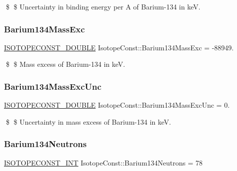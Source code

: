\$ \$ Uncertainty in binding energy per A of Barium-\/134 in keV. \mbox{\label{group___isotope_const-_barium-_ba134_ga58df3934c6c878f1479992f25af3373b}} 
\subsubsection{\texorpdfstring{Barium134\+Mass\+Exc}{Barium134MassExc}}
{\footnotesize\ttfamily \mbox{\hyperlink{group___isotope_const-_macros_ga8f45a7272ce02c0b4c65c44636ed719a}{I\+S\+O\+T\+O\+P\+E\+C\+O\+N\+S\+T\+\_\+\+D\+O\+U\+B\+LE}} Isotope\+Const\+::\+Barium134\+Mass\+Exc = -\/88949.}

\$ \$ Mass excess of Barium-\/134 in keV. \mbox{\label{group___isotope_const-_barium-_ba134_ga915fd84c73e27a6b4ebd34715c513633}} 
\subsubsection{\texorpdfstring{Barium134\+Mass\+Exc\+Unc}{Barium134MassExcUnc}}
{\footnotesize\ttfamily \mbox{\hyperlink{group___isotope_const-_macros_ga8f45a7272ce02c0b4c65c44636ed719a}{I\+S\+O\+T\+O\+P\+E\+C\+O\+N\+S\+T\+\_\+\+D\+O\+U\+B\+LE}} Isotope\+Const\+::\+Barium134\+Mass\+Exc\+Unc = 0.}

\$ \$ Uncertainty in mass excess of Barium-\/134 in keV. \mbox{\label{group___isotope_const-_barium-_ba134_gac3d1ecad94daee22a16ba9f3e88948f1}} 
\subsubsection{\texorpdfstring{Barium134\+Neutrons}{Barium134Neutrons}}
{\footnotesize\ttfamily \mbox{\hyperlink{group___isotope_const-_macros_ga5f18360b3e99483a35c32d789e62621c}{I\+S\+O\+T\+O\+P\+E\+C\+O\+N\+S\+T\+\_\+\+I\+NT}} Isotope\+Const\+::\+Barium134\+Neutrons = 78}

